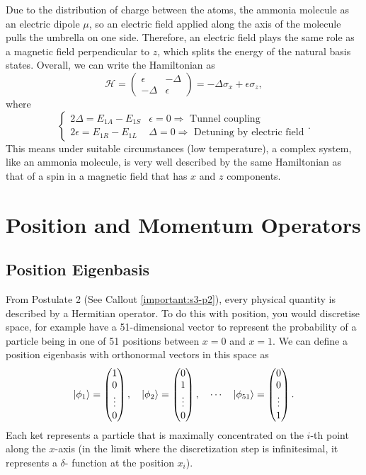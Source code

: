 \documentclass{article}
\begin{document}
Due to the distribution of charge between the atoms, the ammonia molecule as an electric dipole $\mu $, so an electric field applied along the axis of the molecule pulls the umbrella on one side. Therefore, an electric field plays the same role as a magnetic field perpendicular to $z$, which splits the energy of the natural basis states. Overall, we can write the Hamiltonian as
\[
    \mathcal{H}=\begin{pmatrix}
        \epsilon & -\Delta \\ -\Delta & \epsilon 
    \end{pmatrix}=-\Delta \sigma _x+\epsilon \sigma _z,
\]
where
\[
    \begin{cases}
        2\Delta =E_{1A}-E_{1S} & \epsilon =0 \Rightarrow \text{ Tunnel coupling}\\
        2\epsilon =E_{1R}-E_{1L} & \Delta =0 \Rightarrow \text{ Detuning by electric field}
    \end{cases}.
\]
This means under suitable circumstances (low temperature), a complex system, like an ammonia molecule, is very well described by the same Hamiltonian as that of a spin in a magnetic field that has $x$ and $z$ components.

\section{Position and Momentum Operators}
\subsection{Position Eigenbasis}
From Postulate 2 (See Callout \ref{important:s3-p2}), every physical quantity is described by a Hermitian operator. To do this with position, you would discretise space, for example have a 51-dimensional vector to represent the probability of a particle being in one of 51 positions between $x=0$ and $x=1$. We can define a position eigenbasis with orthonormal vectors in this space as
\[
    \ket{\phi _1}=\begin{pmatrix}
        1 \\ 0 \\ \vdots \\ 0
    \end{pmatrix},\quad \ket{\phi _2}=\begin{pmatrix}
        0 \\ 1 \\ \vdots \\ 0
    \end{pmatrix},\quad \cdots\quad \ket{\phi _{51}}=\begin{pmatrix}
        0 \\ 0 \\ \vdots \\ 1
    \end{pmatrix}.
\]
Each ket represents a particle that is maximally concentrated on the $i$-th point along the $x$-axis (in the limit where the discretization step is infinitesimal, it represents a $\delta $- function at the position $x_i$).
\end{document}

